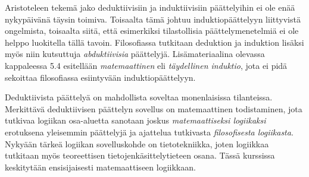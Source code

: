 Aristoteleen tekemä jako deduktiivisiin ja induktiivisiin päättelyihin ei ole enää nykypäivänä täysin toimiva. Toisaalta tämä johtuu induktiopäättelyyn liittyvistä ongelmista, toisaalta siitä, että esimerkiksi tilastollisia päättelymenetelmiä ei ole helppo luokitella tällä tavoin. Filosofiassa tutkitaan deduktion ja induktion lisäksi myös niin kutsuttuja \emph{abduktiivisia} päättelyjä. Lisämateriaalina olevassa kappaleessa 5.4 esitellään \emph{matemaattinen} eli \emph{täydellinen induktio}, jota ei pidä sekoittaa filosofiassa esiintyvään induktiopäättelyyn.

Deduktiivista päättelyä on mahdollista soveltaa monenlaisissa tilanteissa. Merkittävä deduktiivisen päättelyn sovellus on matemaattinen todistaminen, jota tutkivaa logiikan osa-aluetta sanotaan joskus \emph{matemaattiseksi logiikaksi} erotuksena yleisemmin päättelyjä ja ajattelua tutkivasta \emph{filosofisesta logiikasta}. Nykyään tärkeä logiikan sovelluskohde on tietotekniikka, joten logiikkaa tutkitaan myös teoreettisen tietojen\-käsittely\-tieteen osana. Tässä kurssissa keskitytään ensisijaisesti matemaattiseen logiikkaan.


